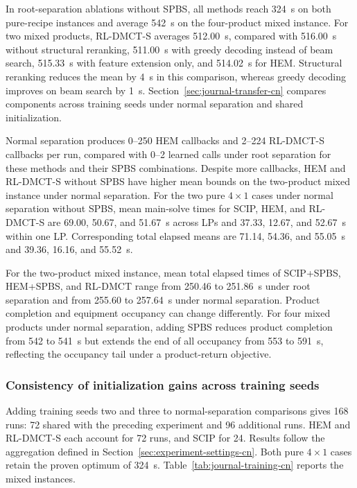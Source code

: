 \documentclass[final,5p,times,twocolumn]{elsarticle}
\begin{document}
In root-separation ablations without SPBS, all methods reach 324~s on both pure-recipe instances and average 542~s on the four-product mixed instance. For two mixed products, RL-DMCT-S averages 512.00~s, compared with 516.00~s without structural reranking, 511.00~s with greedy decoding instead of beam search, 515.33~s with feature extension only, and 514.02~s for HEM. Structural reranking reduces the mean by 4~s in this comparison, whereas greedy decoding improves on beam search by 1~s. Section~\ref{sec:journal-transfer-cn} compares components across training seeds under normal separation and shared initialization.

Normal separation produces 0--250 HEM callbacks and 2--224 RL-DMCT-S callbacks per run, compared with 0--2 learned calls under root separation for these methods and their SPBS combinations. Despite more callbacks, HEM and RL-DMCT-S without SPBS have higher mean bounds on the two-product mixed instance under normal separation. For the two pure $4\times1$ cases under normal separation without SPBS, mean main-solve times for SCIP, HEM, and RL-DMCT-S are 69.00, 50.67, and 51.67~s across LPs and 37.33, 12.67, and 52.67~s within one LP. Corresponding total elapsed means are 71.14, 54.36, and 55.05~s and 39.36, 16.16, and 55.52~s.

For the two-product mixed instance, mean total elapsed times of SCIP+SPBS, HEM+SPBS, and RL-DMCT range from 250.46 to 251.86~s under root separation and from 255.60 to 257.64~s under normal separation. Product completion and equipment occupancy can change differently. For four mixed products under normal separation, adding SPBS reduces product completion from 542 to 541~s but extends the end of all occupancy from 553 to 591~s, reflecting the occupancy tail under a product-return objective.

\subsubsection{Consistency of initialization gains across training seeds}
\label{sec:journal-training-cn}
Adding training seeds two and three to normal-separation comparisons gives 168 runs: 72 shared with the preceding experiment and 96 additional runs. HEM and RL-DMCT-S each account for 72 runs, and SCIP for 24. Results follow the aggregation defined in Section~\ref{sec:experiment-settings-cn}. Both pure $4\times1$ cases retain the proven optimum of 324~s. Table~\ref{tab:journal-training-cn} reports the mixed instances.
\end{document}
